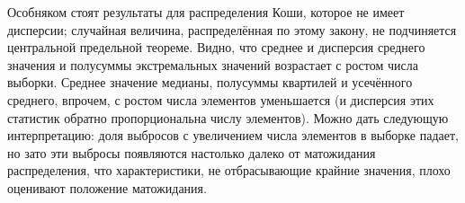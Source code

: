 \documentclass[report1.tex]{subfiles}
\begin{document}
Особняком стоят результаты для распределения Коши, которое не имеет дисперсии; случайная величина, распределённая по этому закону, не подчиняется центральной предельной теореме. Видно, что среднее и дисперсия среднего значения и полусуммы экстремальных значений возрастает с ростом числа выборки. Среднее значение медианы, полусуммы квартилей и усечённого среднего, впрочем,  с ростом числа элементов уменьшается (и дисперсия этих статистик обратно пропорциональна числу элементов). Можно дать следующую интерпретацию: доля выбросов с увеличением числа элементов в выборке падает, но зато эти выбросы появляются настолько далеко от матожидания распределения, что характеристики, не отбрасывающие крайние значения, плохо оценивают положение матожидания.
\end{document}

